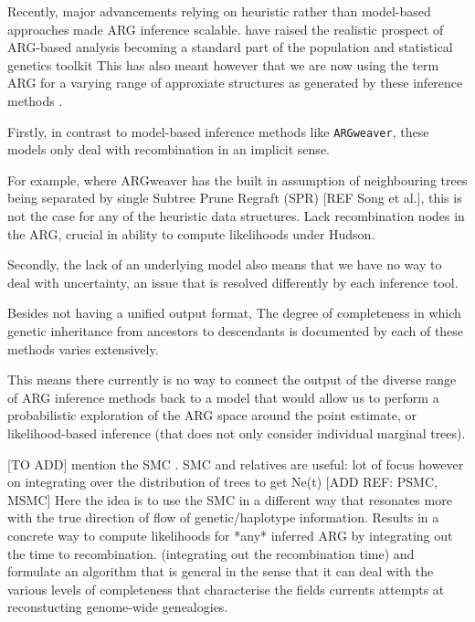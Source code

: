 \documentclass{article}
\newcommand{\argweaver}[0]{\texttt{ARGweaver}}
\begin{document}
Recently, major advancements 
relying on heuristic rather than model-based approaches
made ARG inference scalable.
\citep{rasmussen_2014, kelleher_2019, speidel_2019, schaefer_2021, wohns_2022, 
zhang_biobank-scale_2023, zhan_towards_2023}
have raised the realistic prospect of ARG-based analysis becoming a standard 
part of the population and statistical genetics toolkit
This has also meant however that
we are now using the term ARG for a varying range of approxiate structures
as generated by these inference methods \citep{wong_a-general_2023}.



Firstly, in contrast to model-based inference methods like \argweaver, 
these models only deal with recombination in an implicit sense.


For example, where ARGweaver has 
the built in assumption of neighbouring trees being separated by single Subtree Prune 
Regraft (SPR) [REF Song et al.], this is not the case for any of the heuristic data 
structures.
Lack recombination nodes in the ARG, crucial in ability to compute likelihoods 
under Hudson. \citep{Wong_a-general_2023}

Secondly, the lack of an underlying model also means that
we have no way to deal with uncertainty, an issue that is 
resolved differently by each inference tool.

Besides not having a unified output format, The degree of completeness 
in which genetic inheritance from ancestors to 
descendants is documented by each of these methods varies extensively.


This means there currently is no way to connect the output of the diverse 
range of ARG inference methods back 
to a model that would allow us to perform a probabilistic exploration of the 
ARG space around the point estimate, or likelihood-based inference 
(that does not only consider individual marginal trees).


[TO ADD] mention the SMC \citep{mcvean_approximating_2004}.
SMC and relatives are useful: lot of focus however on integrating over 
the distribution of trees to get Ne(t) [ADD REF: PSMC, MSMC]
Here the idea is to use the SMC in a different way that resonates more 
with the true direction of flow of genetic/haplotype information.
Results in a concrete way to compute likelihoods for *any* inferred ARG 
by integrating out the time to recombination.
(integrating out the recombination time)
and formulate an algorithm 
that is general in the sense that it can deal with the various levels of 
completeness that characterise the fields currents attempts at reconstucting genome-wide 
genealogies.
\end{document}
